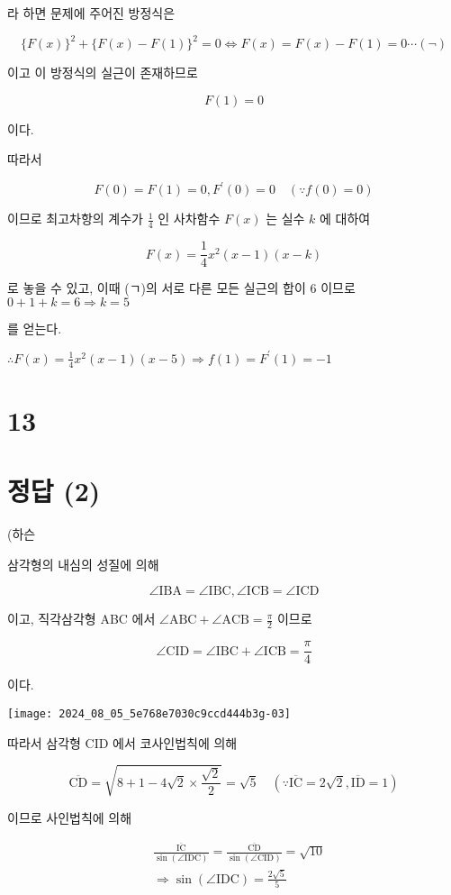 \documentclass[10pt]{article}
\begin{document}
라 하면 문제에 주어진 방정식은

\[
\{F(x)\}^{2}+\{F(x)-F(1)\}^{2}=0 \Leftrightarrow F(x)=F(x)-F(1)=0 \cdots(\neg)
\]

이고 이 방정식의 실근이 존재하므로

\[
F(1)=0
\]

이다.

따라서

\[
F(0)=F(1)=0, F^{\prime}(0)=0 \quad(\because f(0)=0)
\]

이므로 최고차항의 계수가 \(\frac{1}{4}\) 인 사차함수 \(F(x)\) 는 실수 \(k\) 에 대하여

\[
F(x)=\frac{1}{4} x^{2}(x-1)(x-k)
\]

로 놓을 수 있고, 이때 (ㄱ)의 서로 다른 모든 실근의 합이 6 이므로 \(0+1+k=6 \Rightarrow k=5\)

를 얻는다.

\(\therefore F(x)=\frac{1}{4} x^{2}(x-1)(x-5) \Rightarrow f(1)=F^{\prime}(1)=-1\)

\section*{13}
\section*{정답 (2)}
(하슨

삼각형의 내심의 성질에 의해

\[
\angle \mathrm{IBA}=\angle \mathrm{IBC}, \angle \mathrm{ICB}=\angle \mathrm{ICD}
\]

이고, 직각삼각형 ABC 에서 \(\angle \mathrm{ABC}+\angle \mathrm{ACB}=\frac{\pi}{2}\) 이므로

\[
\angle \mathrm{CID}=\angle \mathrm{IBC}+\angle \mathrm{ICB}=\frac{\pi}{4}
\]

이다.

\begin{center}
\texttt{[image: 2024\_08\_05\_5e768e7030c9ccd444b3g-03]}
\end{center}

따라서 삼각형 CID 에서 코사인법칙에 의해

\[
\overline{\mathrm{CD}}=\sqrt{8+1-4 \sqrt{2} \times \frac{\sqrt{2}}{2}}=\sqrt{5} \quad(\because \overline{\mathrm{IC}}=2 \sqrt{2}, \overline{\mathrm{ID}}=1)
\]

이므로 사인법칙에 의해

\[
\begin{aligned}
& \frac{\overline{\mathrm{IC}}}{\sin (\angle \mathrm{IDC})}=\frac{\overline{\mathrm{CD}}}{\sin (\angle \mathrm{CID})}=\sqrt{10} \\
& \Rightarrow \sin (\angle \mathrm{IDC})=\frac{2 \sqrt{5}}{5}
\end{aligned}
\]
\end{document}
